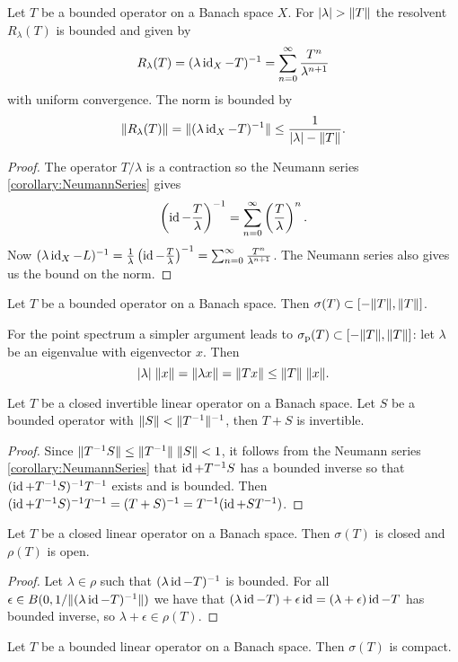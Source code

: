 \begin{proposition}
Let $T$ be a bounded operator on a Banach space $X$. For $|\lambda|>\norm{T}$ the resolvent $R_\lambda(T)$ is bounded and given by
\[ R_\lambda(T) = (\lambda \operatorname{id}_X - T)^{-1} = \sum_{n=0}^\infty\frac{T^n}{\lambda^{n+1}} \]
with uniform convergence. The norm is bounded by
\[ \lVert R_\lambda(T)\rVert = \lVert(\lambda \operatorname{id}_X - T)^{-1}\rVert \leq \frac{1}{|\lambda|-\lVert T\rVert}. \]
\end{proposition}
\begin{proof}
The operator $T/\lambda$ is a contraction so the Neumann series \ref{corollary:NeumannSeries} gives
\[ \left(\operatorname{id} - \frac{T}{\lambda}\right)^{-1} = \sum_{n=0}^\infty \left(\frac{T}{\lambda}\right)^n.  \]
Now $(\lambda \operatorname{id}_X - L)^{-1} = \frac{1}{\lambda}\left(\operatorname{id} - \frac{T}{\lambda}\right)^{-1} = \sum_{n=0}^\infty \frac{T^n}{\lambda^{n+1}}$. The Neumann series also gives us the bound on the norm.
\end{proof}
\begin{corollary}
Let $T$ be a bounded operator on a Banach space. Then $\sigma(T)\subset [-\lVert T\rVert, \lVert T\rVert]$.
\end{corollary}

For the point spectrum a simpler argument leads to $\sigma_\text{p}(T)\subset [-\lVert T\rVert, \lVert T\rVert]$: let $\lambda$ be an eigenvalue with eigenvector $x$. Then
\[ |\lambda|\;\lVert x\rVert = \lVert\lambda x\rVert = \lVert Tx\rVert \leq \lVert T\rVert\;\lVert x\rVert. \]

\begin{proposition}
Let $T$ be a closed invertible linear operator on a Banach space. Let $S$ be a bounded operator with $\lVert S\rVert < \lVert T^{-1}\rVert^{-1}$, then $T+S$ is invertible.
\end{proposition}
\begin{proof}
Since $\lVert T^{-1}S\rVert \leq \lVert T^{-1}\rVert\;\lVert S\rVert < 1$, it follows from the Neumann series \ref{corollary:NeumannSeries} that $\operatorname{id} + T^{-1}S$ has a bounded inverse so that $(\operatorname{id} + T^{-1}S)^{-1}T^{-1}$ exists and is bounded. Then $(\operatorname{id} + T^{-1}S)^{-1}T^{-1} = (T+S)^{-1} = T^{-1}(\operatorname{id} + ST^{-1})$.
\end{proof}
\begin{corollary}
Let $T$ be a closed linear operator on a Banach space. Then $\sigma(T)$ is closed and $\rho(T)$ is open.
\end{corollary}
\begin{proof}
Let $\lambda \in \rho$ such that $(\lambda\operatorname{id} - T)^{-1}$ is bounded. For all $\epsilon \in B(0, 1/\lVert(\lambda\operatorname{id} - T)^{-1}\rVert)$ we have that $(\lambda\operatorname{id} - T) + \epsilon\operatorname{id} = (\lambda +\epsilon)\operatorname{id} -T$ has bounded inverse, so $\lambda + \epsilon \in \rho(T)$.
\end{proof}
\begin{corollary}
Let $T$ be a bounded linear operator on a Banach space. Then $\sigma(T)$ is compact.
\end{corollary}


